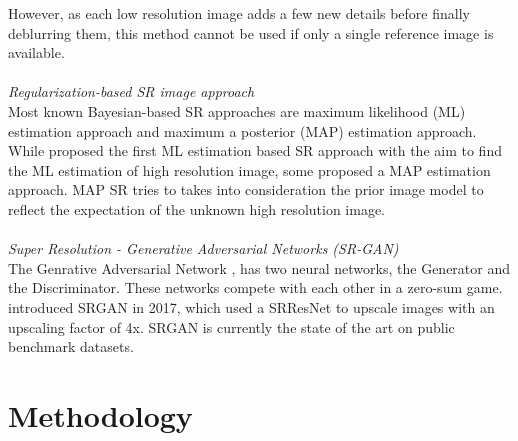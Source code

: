 \documentclass[conference]{IEEEtran}
\begin{document}
However, as each low resolution image adds a few new details before finally deblurring them, this method cannot be used if only a single reference image is available.\\ \\
\hspace*{0.1 in}\textit{Regularization-based SR image approach}\\
\hspace*{0.25 in} Most known Bayesian-based SR approaches are maximum likelihood (ML) estimation approach  and maximum a posterior (MAP) estimation approach.\\
\hspace*{0.25 in}  While \cite{Brian1996ML} proposed the first ML estimation based SR approach with the aim to find the ML estimation of high resolution image, some proposed a MAP estimation approach. MAP SR tries to takes into consideration the prior image model to reflect the expectation of the unknown high resolution image.\\ \\
\hspace*{0.1 in}\textit{Super Resolution - Generative Adversarial Networks (SR-GAN)}\\
\hspace*{0.25 in} The Genrative Adversarial Network \citep{goodfellow2014generative}, has two neural networks, the Generator and the Discriminator. These networks compete with each other in a zero-sum game.
\cite{ledig2017photorealistic} introduced SRGAN in 2017, which used a SRResNet to upscale images with an upscaling factor of 4x. SRGAN is currently the state of the art on public benchmark datasets.

\section{Methodology}
\end{document}
